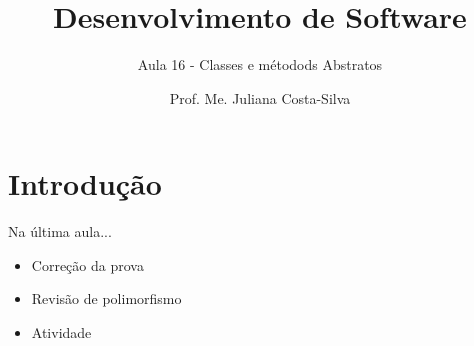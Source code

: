 \documentclass[11pt,aspectratio=43,ignorenonframetext,t]{beamer}
\title{Desenvolvimento de Software}
\subtitle{Aula 16 - Classes e métodods Abstratos}
\author{Prof. Me. Juliana Costa-Silva}
\begin{document}
\maketitle


\section{Introdução}
\begin{frame}{Na última aula...}
 \begin{itemize}
  \item Correção da prova
  \item Revisão de polimorfismo
  \item Atividade 
 \end{itemize}
\end{frame}
\end{document}
